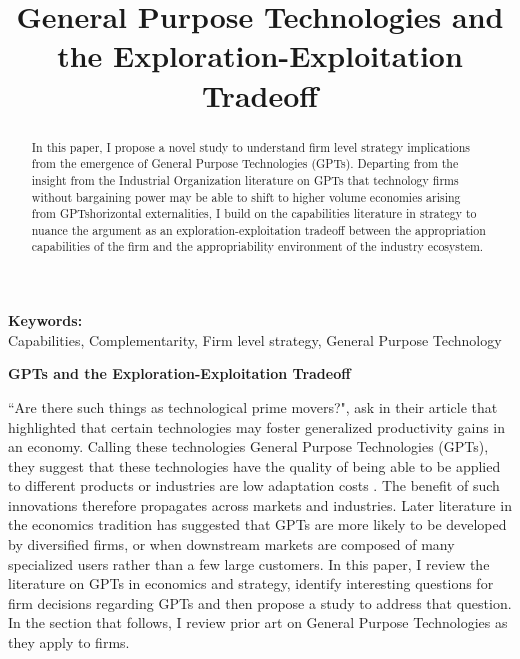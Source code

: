 \documentclass[12pt,letterpaper]{article}
\begin{document}
\title{General Purpose Technologies and the Exploration-Exploitation Tradeoff}
\date{}
\maketitle

\begin{abstract} 
\normalsize 
In this paper, I propose a novel study to understand firm level strategy implications from the emergence of General Purpose Technologies (GPTs). Departing from the insight from the Industrial Organization literature on GPTs that technology firms without bargaining power may be able to shift to higher volume economies arising from GPTs\textquotesingle horizontal externalities, I build on the capabilities literature in strategy to nuance the argument as an exploration-exploitation tradeoff between the appropriation capabilities of the firm and the appropriability environment of the industry ecosystem.
\end{abstract}


{\textbf{Keywords:} \\\indent Capabilities, Complementarity, Firm level strategy, General Purpose Technology}

\newpage
\pagestyle{fancy}
\fancyhf{}
\rhead{\thepage}

\begin{center}
\textbf{GPTs and the Exploration-Exploitation Tradeoff}
\end{center}
``Are there such things as \textquotesingle technological prime movers\textquotesingle ?", ask \cite{Bresnahan1995} in their article that highlighted that certain technologies may foster generalized productivity gains in an economy. Calling these technologies General Purpose Technologies (GPTs), they suggest that these technologies have the quality of being able to be applied to different products or industries are low adaptation costs \citep{Rosenberg2004}. The benefit of such innovations therefore propagates across markets and industries. Later literature in the economics tradition has suggested that GPTs are more likely to be developed by diversified firms, or when downstream markets are composed of many specialized users rather than a few large customers.  In this paper, I review the literature on GPTs in economics and strategy, identify interesting questions for firm decisions regarding GPTs and then propose a study to address that question. In the section that follows, I review prior art on General Purpose Technologies as they apply to firms.
\end{document}
